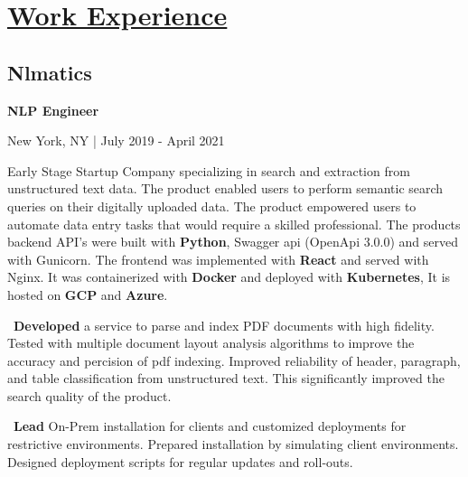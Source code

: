 \documentclass{article}
\begin{document}
\begin{minipage}[t][0pt]{8in\linewidth}
\begin{minipage}[t]{0.45\textwidth\hspace{0in}}
    \section{\underline{Work Experience}}
        \vspace{-0.8em}
        \subsection{Nlmatics}
        \vspace{-0.5em}\hspace{0.1em}
        \mdseries\bfseries{NLP Engineer}
        \vspace{0.1em}
        
        \hspace{0.5em}\mdseries\textrm{New York, NY | July 2019 - April 2021}

        \vspace{-0.8em}
        \begin{minipage}[t]{3.75in\textwidth\hspace{0in}}
            
            \vspace{0.3em}
            {Early Stage Startup Company specializing in search and extraction from unstructured text data. The product enabled users to perform semantic search queries on their digitally uploaded data. The product empowered users to automate data entry tasks that would require a skilled professional. The products backend API's were built with \textbf{Python}, Swagger api (OpenApi 3.0.0) and served with Gunicorn. The frontend was implemented with \textbf{React} and served with Nginx. It was containerized with \textbf{Docker} and deployed with \textbf{Kubernetes}, It is hosted on \textbf{GCP} and \textbf{Azure}.}

            \vspace{0.3em}
            \hspace{1em}\textasteriskcentered \, \mdseries\textrm{\textbf{Developed} a service to parse and index PDF documents with high fidelity. Tested with multiple document layout analysis algorithms to improve the accuracy and percision of pdf indexing. Improved reliability of header, paragraph, and table classification from unstructured text. This significantly improved the search quality of the product.}
            
            \vspace{0.3em}
            \hspace{1em}\textasteriskcentered \, \mdseries\textrm{\textbf{Lead} On-Prem installation for clients and customized deployments for restrictive environments. Prepared installation by simulating client environments. Designed deployment scripts for regular updates and roll-outs.}


\end{minipage}
\end{minipage}
\end{minipage}
\end{document}
